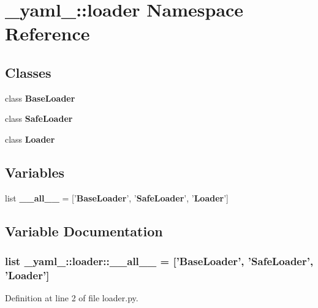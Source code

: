 \section{\_\-yaml\_\-::loader Namespace Reference}
\label{namespace__yaml___1_1loader}


\subsection*{Classes}
\begin{CompactItemize}
\item 
class {\bf BaseLoader}
\item 
class {\bf SafeLoader}
\item 
class {\bf Loader}
\end{CompactItemize}
\subsection*{Variables}
\begin{CompactItemize}
\item 
list {\bf \_\-\_\-all\_\-\_\-} = ['{\bf BaseLoader}', '{\bf SafeLoader}', '{\bf Loader}']
\end{CompactItemize}


\subsection{Variable Documentation}
\subsubsection{\setlength{\rightskip}{0pt plus 5cm}list {\bf \_\-yaml\_\-::loader::\_\-\_\-all\_\-\_\-} = ['{\bf BaseLoader}', '{\bf SafeLoader}', '{\bf Loader}']\hspace{0.3cm}{\tt  [static]}}\label{namespace__yaml___1_1loader_f5df41fe0ef792e2116f86307181f6b8}




Definition at line 2 of file loader.py.
